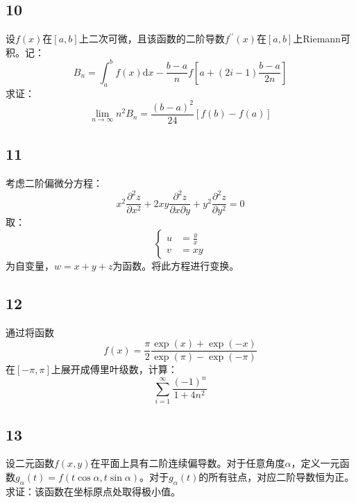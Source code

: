 \documentclass[a4paper,12pt]{article}
\begin{document}
\subsection*{10}\noindent 设$f\left(x\right)$在$\left[a,b\right]$上二次可微，且该函数的二阶导数$f^{\prime\prime}\left(x\right)$在$\left[a,b\right]$上Riemann可积。记：
\begin{equation*}
	B_{n}=\int_{a}^{b}f\left(x\right)\mathrm{d}x-\frac{b-a}{n}f\left[a+\left(2i-1\right)\frac{b-a}{2n}\right]
\end{equation*}
求证：
\begin{equation*}
	\lim\limits_{n\rightarrow\infty}n^2B_{n}=\frac{\left(b-a\right)^2}{24}\left[f\left(b\right)-f\left(a\right)\right]
\end{equation*}
\subsection*{11}考虑二阶偏微分方程：
\begin{equation*}
	x^2\frac{\partial^2 z}{\partial x^2}+2xy\frac{\partial^2 z}{\partial x\partial y}+y^2\frac{\partial^2 z}{\partial y^2}=0
\end{equation*}
取：
\begin{equation*}
	\left\{
	\begin{aligned}
		u&=\frac{y}{x}\\
		v&=xy
	\end{aligned}
	\right.
\end{equation*}
为自变量，$w=x+y+z$为函数。将此方程进行变换。
\subsection*{12}\noindent 通过将函数\begin{equation*}
	f(x)=\frac{\pi}{2}\frac{\exp\left(x\right)+\exp(-x)}{\exp\left(\pi\right)-\exp\left(-\pi\right)}
\end{equation*}
在$\left[-\pi,\pi\right]$上展开成傅里叶级数，计算：
\begin{equation*}
	\sum_{i=1}^{\infty}\frac{\left(-1\right)^{n}}{1+4n^2}
\end{equation*}

\subsection*{13}\noindent 设二元函数$f\left(x,y\right)$在平面上具有二阶连续偏导数。对于任意角度$\alpha$，定义一元函数$g_{\alpha}\left(t\right)=f\left(t\cos\alpha,t\sin\alpha\right)$。对于$g_{\alpha}\left(t\right)$的所有驻点，对应二阶导数恒为正。求证：该函数在坐标原点处取得极小值。
\end{document}

